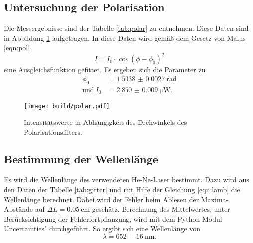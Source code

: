 \subsection{Untersuchung der Polarisation}

Die Messergebnisse sind der Tabelle \ref{tab:polar} zu entnehmen. Diese Daten sind in Abbildung \ref{fig:polar} aufgetragen. In diese Daten wird gemäß dem Gesetz von Malus \eqref{eqn:pol} 
\begin{equation}
    I = I_0 \cdot \cos(\phi - \phi_0)^2
\end{equation}
eine Ausgleichsfunktion gefittet. 
Es ergeben sich die Parameter zu
\begin{align*}
    \phi_0 & = \num{1.5038(27)} \: \text{rad} \\
    \text{und} \: I_0 & = \SI{2.850(9)}{\micro\watt}.
\end{align*}



\begin{figure}
    \centering
    \texttt{[image: build/polar.pdf]}
    \caption{Intensitätswerte in Abhängigkeit des Drehwinkels des Polarisationsfilters.}
    \label{fig:polar}
\end{figure}

\subsection{Bestimmung der Wellenlänge}

Es wird die Wellenlänge des verwendeten He-Ne-Laser bestimmt. Dazu wird aus den Daten der Tabelle \ref{tab:gitter} und mit Hilfe der Gleichung \eqref{eqn:lamb} die Wellenlänge berechnet. Dabei wird der Fehler beim Ablesen der Maxima-Abstände auf $\Delta L = \SI{0.05}{\centi\m}$ geschätz. Berechnung des Mittelwertes, unter Berücksichtigung der Fehlerfortpflanzung, wird mit dem Python Modul \glqq Uncertainties" \cite{uncertainties} durchgeführt.
So ergibt sich eine Wellenlänge von
\begin{equation*}
    \lambda = \SI{652(16)}{\nano\m}.
\end{equation*}

%
